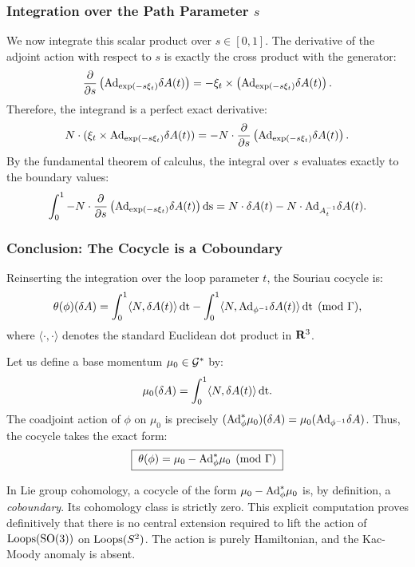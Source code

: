 \documentclass[11pt,reqno,letterpaper,twoside]{amsart}
\begin{document}
  \subsubsection{Integration over the Path Parameter $s$}
  We now integrate this scalar product over $s \in [0,1]$.
  The derivative of the adjoint action with respect to $s$ is exactly the cross product with the generator:
  \[
    \frac{\partial}{\partial s} \left( \mathrm{Ad}_{\exp(-s \xi_t)} \delta A(t) \right) = -\xi_t \times \left( \mathrm{Ad}_{\exp(-s \xi_t)} \delta A(t) \right).
    \]
  Therefore,
  the integrand is a perfect exact derivative:
  \[
    N \cdot (\xi_t \times \mathrm{Ad}_{\exp(-s \xi_t)} \delta A(t)) = - N \cdot \frac{\partial}{\partial s} \left( \mathrm{Ad}_{\exp(-s \xi_t)} \delta A(t) \right).
    \]
  By the fundamental theorem of calculus,
  the integral over $s$ evaluates exactly to the boundary values:
  \[
    \int_0^1 - N \cdot \frac{\partial}{\partial s} \left( \mathrm{Ad}_{\exp(-s \xi_t)} \delta A(t) \right) \mathrm{ds} = N \cdot \delta A(t) - N \cdot \mathrm{Ad}_{A_t^{-1}} \delta A(t).
    \]
  
  \subsubsection{Conclusion: The Cocycle is a Coboundary}
  Reinserting the integration over the loop parameter $t$,
  the Souriau cocycle is:
  \[
    \theta(\phi)(\delta A) = \int_0^1 \langle N, \delta A(t) \rangle \, \mathrm{dt} - \int_0^1 \langle N, \mathrm{Ad}_{\phi^{-1}} \delta A(t) \rangle \, \mathrm{dt} \pmod{\Gamma},
    \]
  where $\langle \cdot, \cdot \rangle$ denotes the standard Euclidean dot product in ${\mathbf{R}}^3$.
  
  Let us define a base momentum $\mu_0 \in \mathcal{G}^*$ by:
  \[
    \mu_0(\delta A) = \int_0^1 \langle N, \delta A(t) \rangle \, \mathrm{dt}.
    \]
  The coadjoint action of $\phi$ on $\mu_0$ is precisely $(\mathrm{Ad}_\phi^* \mu_0)(\delta A) = \mu_0(\mathrm{Ad}_{\phi^{-1}} \delta A)$.
  Thus,
  the cocycle takes the exact form:
  \[
    \boxed{\; \theta(\phi) = \mu_0 - \mathrm{Ad}_\phi^* \mu_0 \pmod{\Gamma} \;}
    \]
  
  In Lie group cohomology,
  a cocycle of the form $\mu_0 - \mathrm{Ad}_\phi^* \mu_0$ is,
  by definition,
  a \emph{coboundary}.
  Its cohomology class is strictly zero.
  This explicit computation proves definitively that there is no central extension required to lift the action of $\operatorname{Loops}(\mathrm{SO}(3))$ on $\operatorname{Loops}(S^2)$.
  The action is purely Hamiltonian,
  and the Kac-Moody anomaly is absent.

  
\end{document}
